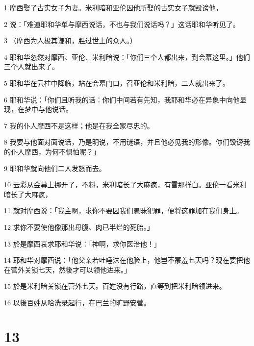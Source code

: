 \par 1 摩西娶了古实女子为妻。米利暗和亚伦因他所娶的古实女子就毁谤他，
\par 2 说：「难道耶和华单与摩西说话，不也与我们说话吗？」这话耶和华听见了。
\par 3 （摩西为人极其谦和，胜过世上的众人。）
\par 4 耶和华忽然对摩西、亚伦、米利暗说：「你们三个人都出来，到会幕这里。」他们三个人就出来了。
\par 5 耶和华在云柱中降临，站在会幕门口，召亚伦和米利暗，二人就出来了。
\par 6 耶和华说：「你们且听我的话：你们中间若有先知，我耶和华必在异象中向他显现，在梦中与他说话。
\par 7 我的仆人摩西不是这样；他是在我全家尽忠的。
\par 8 我要与他面对面说话，乃是明说，不用谜语，并且他必见我的形像。你们毁谤我的仆人摩西，为何不惧怕呢？」
\par 9 耶和华就向他们二人发怒而去。
\par 10 云彩从会幕上挪开了，不料，米利暗长了大麻疯，有雪那样白。亚伦一看米利暗长了大麻疯，
\par 11 就对摩西说：「我主啊，求你不要因我们愚昧犯罪，便将这罪加在我们身上。
\par 12 求你不要使他像那出母腹、肉已半烂的死胎。」
\par 13 於是摩西哀求耶和华说：「神啊，求你医治他！」
\par 14 耶和华对摩西说：「他父亲若吐唾沫在他脸上，他岂不蒙羞七天吗？现在要把他在营外关锁七天，然後才可以领他进来。」
\par 15 於是米利暗关锁在营外七天。百姓没有行路，直等到把米利暗领进来。
\par 16 以後百姓从哈洗录起行，在巴兰的旷野安营。

\chapter{13}

